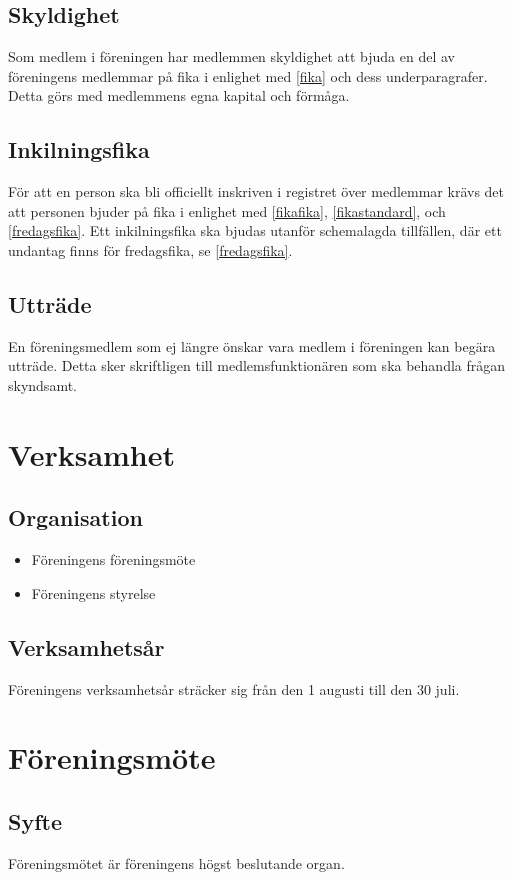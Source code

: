 \documentclass{article}
\begin{document}
\subsection{Skyldighet}
Som medlem i föreningen har medlemmen skyldighet att bjuda en del av föreningens
medlemmar på fika i enlighet med \ref{fika} och dess underparagrafer. Detta görs
med medlemmens egna kapital och förmåga.

\subsection{Inkilningsfika}
För att en person ska bli officiellt inskriven i registret över medlemmar krävs
det att personen bjuder på fika i enlighet med \ref{fikafika},
\ref{fikastandard}, och \ref{fredagsfika}. Ett inkilningsfika ska bjudas utanför
schemalagda tillfällen, där ett undantag finns för fredagsfika, se
\ref{fredagsfika}.

\subsection{Utträde}
En föreningsmedlem som ej längre önskar vara medlem i föreningen kan begära
utträde. Detta sker skriftligen till medlemsfunktionären som ska behandla
frågan skyndsamt.

\section{Verksamhet}
\subsection{Organisation}
\begin{itemize}
  \item Föreningens föreningsmöte
  \item Föreningens styrelse
\end{itemize}
\subsection{Verksamhetsår}
Föreningens verksamhetsår sträcker sig från den 1 augusti till den 30 juli.

\section{Föreningsmöte}
\subsection{Syfte}
Föreningsmötet är föreningens högst beslutande organ.
\end{document}
